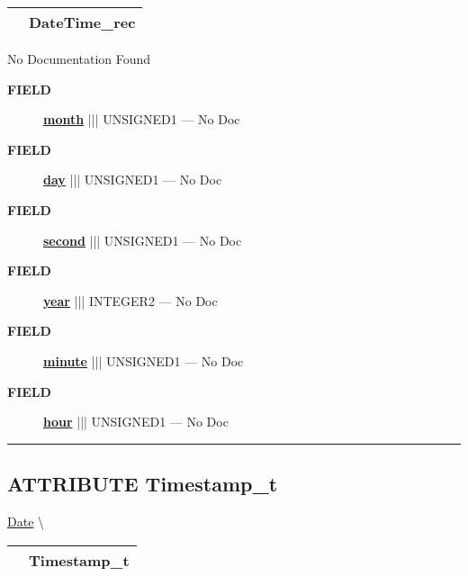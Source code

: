{\renewcommand{\arraystretch}{1.5}
\begin{tabularx}{\textwidth}{|>{\raggedright\arraybackslash}l|X|}
\hline
\hspace{0pt}\mytexttt{\color{red} } & \textbf{DateTime\_rec} \\
\hline
\end{tabularx}
}

\par





No Documentation Found







\par
\begin{description}
\item [\colorbox{tagtype}{\color{white} \textbf{\textsf{FIELD}}}] \textbf{\underline{month}} ||| UNSIGNED1 --- No Doc
\item [\colorbox{tagtype}{\color{white} \textbf{\textsf{FIELD}}}] \textbf{\underline{day}} ||| UNSIGNED1 --- No Doc
\item [\colorbox{tagtype}{\color{white} \textbf{\textsf{FIELD}}}] \textbf{\underline{second}} ||| UNSIGNED1 --- No Doc
\item [\colorbox{tagtype}{\color{white} \textbf{\textsf{FIELD}}}] \textbf{\underline{year}} ||| INTEGER2 --- No Doc
\item [\colorbox{tagtype}{\color{white} \textbf{\textsf{FIELD}}}] \textbf{\underline{minute}} ||| UNSIGNED1 --- No Doc
\item [\colorbox{tagtype}{\color{white} \textbf{\textsf{FIELD}}}] \textbf{\underline{hour}} ||| UNSIGNED1 --- No Doc
\end{description}





\rule{\linewidth}{0.5pt}
\subsection*{\textsf{\colorbox{headtoc}{\color{white} ATTRIBUTE}
Timestamp\_t}}

\hypertarget{ecldoc:date.timestamp_t}{}
\hspace{0pt} \hyperlink{ecldoc:Date}{Date} \textbackslash 

{\renewcommand{\arraystretch}{1.5}
\begin{tabularx}{\textwidth}{|>{\raggedright\arraybackslash}l|X|}
\hline
\hspace{0pt}\mytexttt{\color{red} } & \textbf{Timestamp\_t} \\
\hline
\end{tabularx}
}

